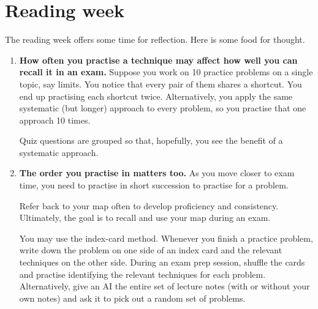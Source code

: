 \documentclass[../main.tex]{subfiles}
\begin{document}
 \section{Reading week}
The reading week offers some time for reflection.  Here is some food for thought.

\begin{enumerate}
  \item \textbf{How often you practise a technique may affect how well you can recall it in an exam.} Suppose you work on 10 practice problems on a single topic, say limits. You notice that every pair of them shares a shortcut. You end up practising each shortcut twice. Alternatively, you apply the same systematic (but longer) approach to every problem, so you practise that one approach 10 times.

    \begin{center}
      
    \end{center}
    Quiz questions are grouped so that, hopefully, you see the benefit of a systematic approach. 

  \item \textbf{The order you practise in matters too.} As you move closer to exam time, you need to practise  in short succession to practise  for a problem.

    \begin{center}
      
    \end{center}

     Refer back to your map often to develop proficiency and consistency. Ultimately, the goal is to recall and use your map during an exam.

    You may use the index-card method. Whenever you finish a practice problem, write down the problem on one side of an index card and the relevant techniques on the other side. During an exam prep session, shuffle the cards and practise identifying the relevant techniques for each problem. Alternatively, give an AI the entire set of lecture notes (with or without your own notes) and ask it to pick out a random set of problems.


\end{enumerate}
\end{document}
